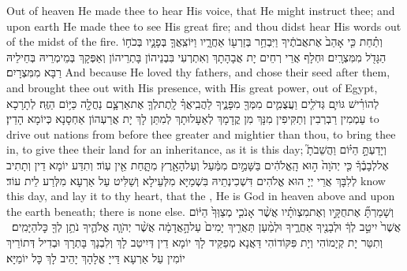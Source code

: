 {Out of heaven He made thee to hear His voice, that He might instruct thee; and upon earth He made thee to see His great fire; and thou didst hear His words out of the midst of the fire.}{}
{וְתַ֗חַת כִּ֤י אָהַב֙ אֶת\maqqaf אֲבֹתֶ֔יךָ וַיִּבְחַ֥ר בְּזַרְע֖וֹ אַחֲרָ֑יו וַיּוֹצִֽאֲךָ֧ בְּפָנָ֛יו בְּכֹח֥וֹ הַגָּדֹ֖ל מִמִּצְרָֽיִם׃}
{וּחְלָף אֲרֵי רְחֵים יָת אֲבָהָתָךְ וְאִתְרְעִי בִּבְנֵיהוֹן בָּתְרֵיהוֹן וְאַפְּקָךְ בְּמֵימְרֵיהּ בְּחֵילֵיהּ רַבָּא מִמִּצְרָיִם׃}
{And because He loved thy fathers, and chose their seed after them, and brought thee out with His presence, with His great power, out of Egypt,}{}
{לְהוֹרִ֗ישׁ גּוֹיִ֛ם גְּדֹלִ֧ים וַעֲצֻמִ֛ים מִמְּךָ֖ מִפָּנֶ֑יךָ לַהֲבִֽיאֲךָ֗ לָֽתֶת\maqqaf לְךָ֧ אֶת\maqqaf אַרְצָ֛ם נַחֲלָ֖ה כַּיּ֥וֹם הַזֶּֽה׃}
{לְתָרָכָא עַמְמִין רַבְרְבִין וְתַקִּיפִין מִנָּךְ מִן קֳדָמָךְ לְאַעָלוּתָךְ לְמִתַּן לָךְ יָת אֲרַעְהוֹן אַחְסָנָא כְּיוֹמָא הָדֵין׃}
{to drive out nations from before thee greater and mightier than thou, to bring thee in, to give thee their land for an inheritance, as it is this day;}{}
{וְיָדַעְתָּ֣ הַיּ֗וֹם וַהֲשֵׁבֹתָ֮ אֶל\maqqaf לְבָבֶ֒ךָ֒ כִּ֤י יְהֹוָה֙ ה֣וּא הָֽאֱלֹהִ֔ים בַּשָּׁמַ֣יִם מִמַּ֔עַל וְעַל\maqqaf הָאָ֖רֶץ מִתָּ֑חַת אֵ֖ין עֽוֹד׃}
{וְתִדַּע יוֹמָא דֵין וְתָתִיב לְלִבָּךְ אֲרֵי יְיָ הוּא אֱלֹהִים דִּשְׁכִינְתֵיהּ בִּשְׁמַיָּא מִלְּעֵילָא וְשַׁלִּיט עַל אַרְעָא מִלְּרַע לֵית עוֹד׃}
{know this day, and lay it to thy heart, that the \lord, He is God in heaven above and upon the earth beneath; there is none else.}{}
{וְשָׁמַרְתָּ֞ אֶת\maqqaf חֻקָּ֣יו וְאֶת\maqqaf מִצְוֺתָ֗יו אֲשֶׁ֨ר אָנֹכִ֤י מְצַוְּךָ֙ הַיּ֔וֹם אֲשֶׁר֙ יִיטַ֣ב לְךָ֔ וּלְבָנֶ֖יךָ אַחֲרֶ֑יךָ וּלְמַ֨עַן תַּאֲרִ֤יךְ יָמִים֙ עַל\maqqaf הָ֣אֲדָמָ֔ה אֲשֶׁ֨ר יְהֹוָ֧ה אֱלֹהֶ֛יךָ נֹתֵ֥ן לְךָ֖ כׇּל\maqqaf הַיָּמִֽים׃ \petucha }
{וְתִטַּר יָת קְיָמוֹהִי וְיָת פִּקּוֹדוֹהִי דַּאֲנָא מְפַקֵּיד לָךְ יוֹמָא דֵין דְּיִיטַב לָךְ וְלִבְנָךְ בָּתְרָךְ וּבְדִיל דְּתוֹרֵיךְ יוֹמִין עַל אַרְעָא דַּייָ אֱלָהָךְ יָהֵיב לָךְ כָּל יוֹמַיָּא׃}
